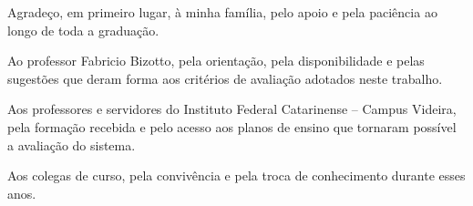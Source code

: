 \begin{agradecimentos}

Agradeço, em primeiro lugar, à minha família, pelo apoio e pela paciência ao longo de toda a graduação.

Ao professor Fabricio Bizotto, pela orientação, pela disponibilidade e pelas sugestões que deram forma aos critérios de avaliação adotados neste trabalho.

Aos professores e servidores do Instituto Federal Catarinense -- Campus Videira, pela formação recebida e pelo acesso aos planos de ensino que tornaram possível a avaliação do sistema.

Aos colegas de curso, pela convivência e pela troca de conhecimento durante esses anos.

\end{agradecimentos}
